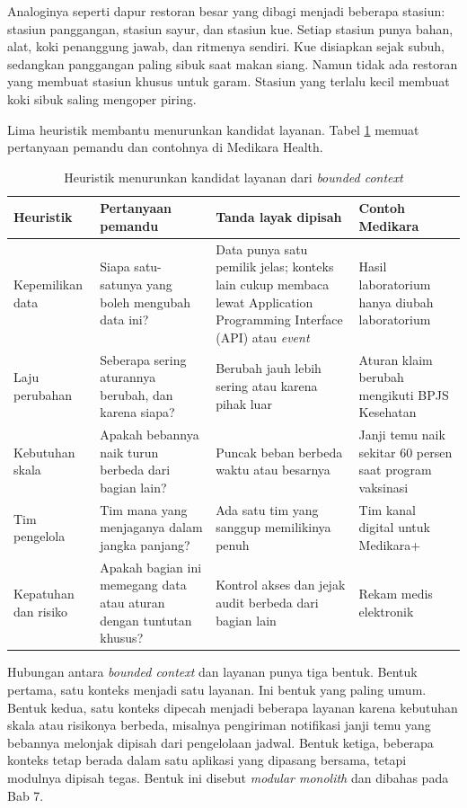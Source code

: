 Analoginya seperti dapur restoran besar yang dibagi menjadi beberapa stasiun: stasiun panggangan,
stasiun sayur, dan stasiun kue. Setiap stasiun punya bahan, alat, koki penanggung jawab, dan
ritmenya sendiri. Kue disiapkan sejak subuh, sedangkan panggangan paling sibuk saat makan siang.
Namun tidak ada restoran yang membuat stasiun khusus untuk garam. Stasiun yang terlalu kecil membuat
koki sibuk saling mengoper piring.

Lima heuristik membantu menurunkan kandidat layanan. Tabel \ref{tab:ch06-heuristik} memuat
pertanyaan pemandu dan contohnya di Medikara Health.

\begin{table}[!htb]
  \centering
  \caption{Heuristik menurunkan kandidat layanan dari \textit{bounded context}}
  \label{tab:ch06-heuristik}
  \footnotesize
  \begin{tabularx}{\textwidth}{>{\raggedright\arraybackslash}p{2.1cm} >{\raggedright\arraybackslash}X >{\raggedright\arraybackslash}X >{\raggedright\arraybackslash}X}
    \hline
    \textbf{Heuristik} & \textbf{Pertanyaan pemandu} & \textbf{Tanda layak dipisah} &
      \textbf{Contoh Medikara} \\ \hline
    Kepemilikan data & Siapa satu-satunya yang boleh mengubah data ini? & Data punya satu pemilik
      jelas; konteks lain cukup membaca lewat Application Programming Interface (API) atau
      \textit{event} & Hasil laboratorium hanya
      diubah laboratorium \\ \hline
    Laju perubahan & Seberapa sering aturannya berubah, dan karena siapa? & Berubah jauh lebih sering
      atau karena pihak luar & Aturan klaim berubah mengikuti BPJS Kesehatan \\ \hline
    Kebutuhan skala & Apakah bebannya naik turun berbeda dari bagian lain? & Puncak beban berbeda
      waktu atau besarnya & Janji temu naik sekitar 60 persen saat program vaksinasi \\ \hline
    Tim pengelola & Tim mana yang menjaganya dalam jangka panjang? & Ada satu tim yang sanggup
      memilikinya penuh & Tim kanal digital untuk Medikara+ \\ \hline
    Kepatuhan dan risiko & Apakah bagian ini memegang data atau aturan dengan tuntutan khusus? &
      Kontrol akses dan jejak audit berbeda dari bagian lain & Rekam medis elektronik \\ \hline
  \end{tabularx}
\end{table}

Hubungan antara \textit{bounded context} dan layanan punya tiga bentuk. Bentuk pertama, satu
konteks menjadi satu layanan. Ini bentuk yang paling umum. Bentuk kedua, satu konteks dipecah
menjadi beberapa layanan karena kebutuhan skala atau risikonya berbeda, misalnya pengiriman
notifikasi janji temu yang bebannya melonjak dipisah dari pengelolaan jadwal. Bentuk ketiga,
beberapa konteks tetap berada dalam satu aplikasi yang dipasang bersama, tetapi modulnya dipisah
tegas. Bentuk ini disebut \textit{modular monolith} dan dibahas pada Bab 7.

